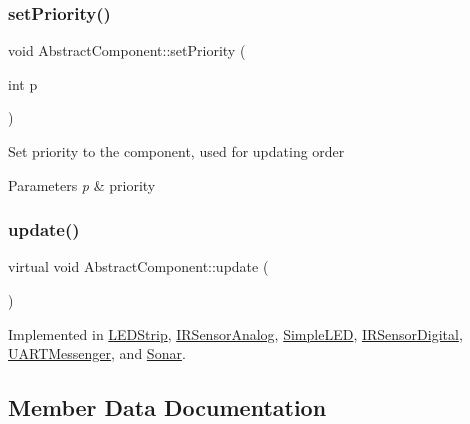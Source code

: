\subsubsection{\texorpdfstring{set\+Priority()}{setPriority()}}
{\footnotesize\ttfamily void Abstract\+Component\+::set\+Priority (\begin{DoxyParamCaption}\item[{int}]{p }\end{DoxyParamCaption})\hspace{0.3cm}{\ttfamily [inline]}}

Set priority to the component, used for updating order


\begin{DoxyParams}{Parameters}
{\em p} & priority \\
\hline
\end{DoxyParams}
\mbox{\label{class_abstract_component_af25a90b8ab213762221c3b358d9873f3}} 
\subsubsection{\texorpdfstring{update()}{update()}}
{\footnotesize\ttfamily virtual void Abstract\+Component\+::update (\begin{DoxyParamCaption}{ }\end{DoxyParamCaption})\hspace{0.3cm}{\ttfamily [pure virtual]}}



Implemented in \hyperlink{class_l_e_d_strip_abc57d90870bb0e9c0d05e7ba6ca76c95}{L\+E\+D\+Strip}, \hyperlink{class_i_r_sensor_analog_a919942de7c5fc3af5da9a2b32e31d328}{I\+R\+Sensor\+Analog}, \hyperlink{class_simple_l_e_d_a1642dc4aca42ad46e5663a39cdda005f}{Simple\+L\+ED}, \hyperlink{class_i_r_sensor_digital_a8d09a546a1f4b4c6533c324d98a146a9}{I\+R\+Sensor\+Digital}, \hyperlink{class_u_a_r_t_messenger_a7f2c3bdcf3a2b082e52815b97be37281}{U\+A\+R\+T\+Messenger}, and \hyperlink{class_sonar_aaf10dd734528b86b4dea3ab35c4ee4f4}{Sonar}.



\subsection{Member Data Documentation}
\mbox{\label{class_abstract_component_a9c9c548149681b1a1dd935e66ed5dd11}} 
